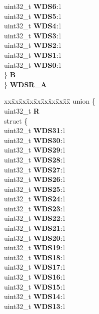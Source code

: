 \begin{DoxyCompactItemize}
\begin{tabbing}
\>\>uint32\_t {\bfseries WDS6}:1\\
\>\>uint32\_t {\bfseries WDS5}:1\\
\>\>uint32\_t {\bfseries WDS4}:1\\
\>\>uint32\_t {\bfseries WDS3}:1\\
\>\>uint32\_t {\bfseries WDS2}:1\\
\>\>uint32\_t {\bfseries WDS1}:1\\
\>\>uint32\_t {\bfseries WDS0}:1\\
\>\} {\bfseries B}\\
\} {\bfseries WDSR\_A}\\

\end{tabbing}\item 
\mbox{\label{structETPU__tag_aaa3d04bf96374addb48e25a404aef382}} 
\begin{tabbing}
xx\=xx\=xx\=xx\=xx\=xx\=xx\=xx\=xx\=\kill
union \{\\
\>uint32\_t {\bfseries R}\\
\>struct \{\\
\>\>uint32\_t {\bfseries WDS31}:1\\
\>\>uint32\_t {\bfseries WDS30}:1\\
\>\>uint32\_t {\bfseries WDS29}:1\\
\>\>uint32\_t {\bfseries WDS28}:1\\
\>\>uint32\_t {\bfseries WDS27}:1\\
\>\>uint32\_t {\bfseries WDS26}:1\\
\>\>uint32\_t {\bfseries WDS25}:1\\
\>\>uint32\_t {\bfseries WDS24}:1\\
\>\>uint32\_t {\bfseries WDS23}:1\\
\>\>uint32\_t {\bfseries WDS22}:1\\
\>\>uint32\_t {\bfseries WDS21}:1\\
\>\>uint32\_t {\bfseries WDS20}:1\\
\>\>uint32\_t {\bfseries WDS19}:1\\
\>\>uint32\_t {\bfseries WDS18}:1\\
\>\>uint32\_t {\bfseries WDS17}:1\\
\>\>uint32\_t {\bfseries WDS16}:1\\
\>\>uint32\_t {\bfseries WDS15}:1\\
\>\>uint32\_t {\bfseries WDS14}:1\\
\>\>uint32\_t {\bfseries WDS13}:1\\

\end{tabbing}
\end{DoxyCompactItemize}
